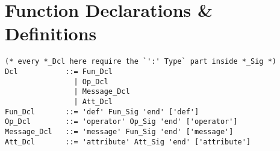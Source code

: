 



\newpage

\section{Function Declarations \& Definitions}
\label{sec:function-decls-defs}

\syntax\begin{lstlisting}
(* every *_Dcl here require the `':' Type` part inside *_Sig *)
Dcl           ::= Fun_Dcl
                | Op_Dcl
                | Message_Dcl 
                | Att_Dcl
Fun_Dcl       ::= 'def' Fun_Sig 'end' ['def']
Op_Dcl        ::= 'operator' Op_Sig 'end' ['operator']
Message_Dcl   ::= 'message' Fun_Sig 'end' ['message']
Att_Dcl       ::= 'attribute' Att_Sig 'end' ['attribute']


\end{lstlisting}
